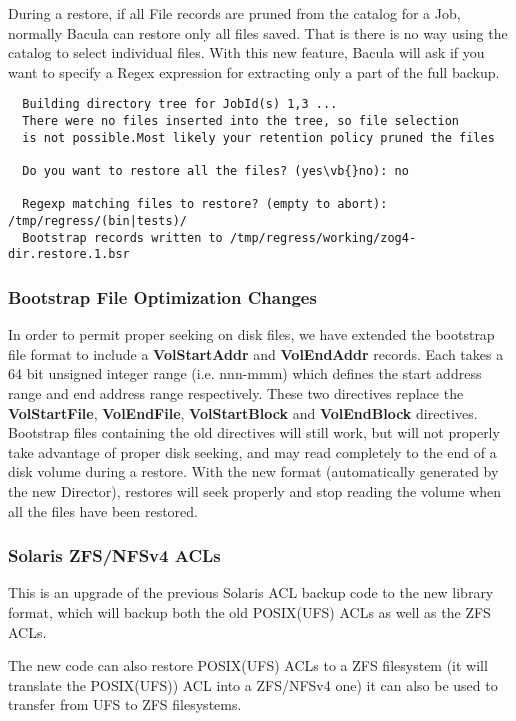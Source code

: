   During a restore, if all File records are pruned from the catalog
  for a Job, normally Bacula can restore only all files saved. That
  is there is no way using the catalog to select individual files.
  With this new feature, Bacula will ask if you want to specify a Regex
  expression for extracting only a part of the full backup.

\begin{verbatim}
  Building directory tree for JobId(s) 1,3 ...
  There were no files inserted into the tree, so file selection
  is not possible.Most likely your retention policy pruned the files
  
  Do you want to restore all the files? (yes\vb{}no): no
  
  Regexp matching files to restore? (empty to abort): /tmp/regress/(bin|tests)/
  Bootstrap records written to /tmp/regress/working/zog4-dir.restore.1.bsr
\end{verbatim}

\subsubsection{Bootstrap File Optimization Changes}
In order to permit proper seeking on disk files, we have extended the bootstrap
file format to include a {\bf VolStartAddr} and {\bf VolEndAddr} records. Each
takes a 64 bit unsigned integer range (i.e. nnn-mmm) which defines the start
address range and end address range respectively.  These two directives replace
the {\bf VolStartFile}, {\bf VolEndFile}, {\bf VolStartBlock} and {\bf
  VolEndBlock} directives.  Bootstrap files containing the old directives will
still work, but will not properly take advantage of proper disk seeking, and
may read completely to the end of a disk volume during a restore.  With the new
format (automatically generated by the new Director), restores will seek
properly and stop reading the volume when all the files have been restored.

\subsubsection{Solaris ZFS/NFSv4 ACLs}
This is an upgrade of the previous Solaris ACL backup code
to the new library format, which will backup both the old
POSIX(UFS) ACLs as well as the ZFS ACLs.

The new code can also restore POSIX(UFS) ACLs to a ZFS filesystem
(it will translate the POSIX(UFS)) ACL into a ZFS/NFSv4 one) it can also
be used to transfer from UFS to ZFS filesystems.


